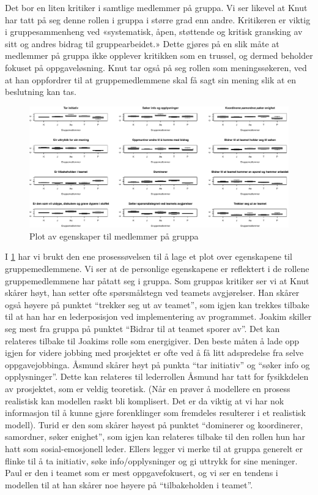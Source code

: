 Det bor en liten kritiker i samtlige medlemmer på gruppa. Vi ser likevel at Knut har tatt på 
seg denne rollen i gruppa i større grad enn andre. Kritikeren er viktig i gruppesammenheng 
ved «systematisk, åpen, støttende og kritisk gransking av sitt og andres bidrag til gruppearbeidet.»
Dette gjøres på en slik måte at medlemmer på gruppa ikke opplever kritikken som en trussel, 
og dermed beholder fokuset på oppgaveløsning. Knut tar også på seg rollen som meningssøkeren, 
ved at han oppfordrer til at gruppemedlemmene skal få sagt sin mening slik at en beslutning
kan tas.\\

\begin{figure}[H]
\centering
\includegraphics[scale=0.4]{teammedlem.pdf}
\caption{Plot av egenskaper til medlemmer på gruppa}
\label{fig:medlemmer}
\end{figure}

I \cref{fig:medlemmer} har vi brukt den ene prosessøvelsen til å
lage et plot over egenskapene til gruppemedlemmene. Vi ser at de personlige
 egenskapene er reflektert i de rollene gruppemedlemmene har påtatt seg i gruppa. Som gruppas
kritiker ser vi at Knut skårer høyt, han setter ofte spørsmålstegn ved teamets avgjørelser. 
Han skårer også høyere på punktet ``trekker seg ut av teamet'', som igjen kan trekkes tilbake 
til at han har en lederposisjon ved implementering av
programmet. Joakim skiller seg mest fra gruppa på punktet ``Bidrar til at teamet 
sporer av''. Det kan relateres tilbake til Joakims rolle som energigiver. Den beste måten å lade opp igjen
for videre jobbing med prosjektet er ofte ved å få litt adspredelse fra selve oppgavejobbinga.
Åsmund skårer høyt på punkta ``tar initiativ'' og ``søker info og opplysninger''. 
Dette kan relateres til lederrollen Åsmund har tatt for fysikkdelen av prosjektet,
som er veldig teoretisk. (Når en prøver å modellere en prosess realistisk kan
modellen raskt bli komplisert. Det er da viktig at vi har nok informasjon til å
kunne gjøre forenklinger som fremdeles resulterer i et realistisk modell).
Turid er den som skårer høyest på punktet ``dominerer og koordinerer, samordner, søker
enighet'', som igjen kan relateres tilbake til den rollen hun har hatt som
sosial-emosjonell leder. Ellers legger vi merke til at gruppa
generelt er flinke til å ta initiativ, søke info/opplysninger og gi uttrykk for sine meninger. Paul
er den i teamet som er mest oppgavefokusert, og vi ser en tendens i modellen til
at han skårer noe høyere på ``tilbakeholden i teamet''.\\

